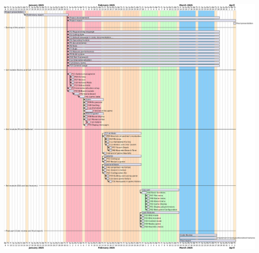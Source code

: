 \documentclass{article}
\begin{document}
\begin{center}
    \includegraphics[width=\textwidth,height=\textheight,keepaspectratio]{gantt}
\end{center}
\end{document}

